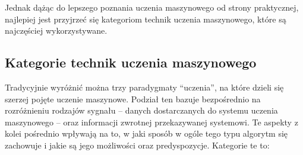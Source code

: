 Jednak dążąc do lepszego poznania uczenia maszynowego od strony praktycznej, najlepiej jest przyjrzeć się kategoriom technik uczenia maszynowego, które są najczęściej wykorzystywane.

\subsection{Kategorie technik uczenia maszynowego}

Tradycyjnie wyróżnić można trzy paradygmaty ``uczenia'', na które dzieli się szerzej pojęte uczenie maszynowe.
Podział ten bazuje bezpośrednio na rozróżnieniu rodzajów sygnału -- danych dostarczanych do systemu uczenia maszynowego -- oraz informacji zwrotnej przekazywanej systemowi.
Te aspekty z kolei pośrednio wpływają na to, w jaki sposób w ogóle tego typu algorytm się zachowuje i jakie są jego możliwości oraz predyspozycje.
Kategorie te to:

